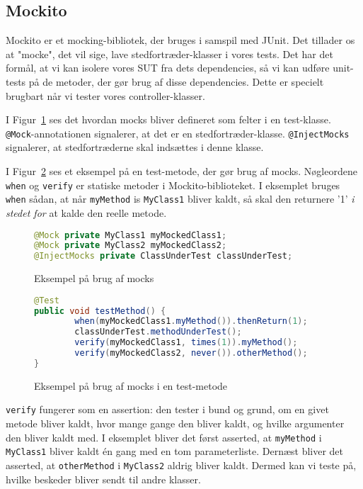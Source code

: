 \subsection{Mockito}
Mockito er et mocking-bibliotek, der bruges i samspil med JUnit. Det tillader os at "mocke", det vil sige, lave stedfortræder-klasser i vores tests. Det har det formål, at vi kan isolere vores SUT fra dets dependencies, så vi kan udføre unit-tests på de metoder, der gør brug af disse dependencies. Dette er specielt brugbart når vi tester vores controller-klasser.

I Figur~\ref{fig:MockEkempel} ses det hvordan mocks bliver defineret som felter i en test-klasse. \texttt{@Mock}-annotationen signalerer, at det er en stedfortræder-klasse. \texttt{@InjectMocks} signalerer, at stedfortræderne skal indsættes i denne klasse.

I Figur~\ref{fig:MockTestEksempel} ses et eksempel på en test-metode, der gør brug af mocks. Nøgleordene \texttt{when} og \texttt{verify} er statiske metoder i Mockito-biblioteket. I eksemplet bruges \texttt{when} sådan, at når \texttt{myMethod} is \texttt{MyClass1} bliver kaldt, så skal den returnere '1' \textit{i stedet for} at kalde den reelle metode. 

\begin{figure}
    \begin{lstlisting}[language=Java]
@Mock private MyClass1 myMockedClass1;
@Mock private MyClass2 myMockedClass2;
@InjectMocks private ClassUnderTest classUnderTest;
    \end{lstlisting}
    \caption{Eksempel på brug af mocks \label{fig:MockEkempel}}
\end{figure}

\begin{figure}
    \begin{lstlisting}[language=Java]
@Test
public void testMethod() {
        when(myMockedClass1.myMethod()).thenReturn(1);
        classUnderTest.methodUnderTest();
        verify(myMockedClass1, times(1)).myMethod();
        verify(myMockedClass2, never()).otherMethod();
}
    \end{lstlisting}
    \caption{Eksempel på brug af mocks i en test-metode\label{fig:MockTestEksempel}}
\end{figure}

\texttt{verify} fungerer som en assertion: den tester i bund og grund, om en givet metode bliver kaldt, hvor mange gange den bliver kaldt, og hvilke argumenter den bliver kaldt med. I eksemplet bliver det først asserted, at \texttt{myMethod} i \texttt{MyClass1} bliver kaldt én gang med en tom parameterliste. Dernæst bliver det asserted, at \texttt{otherMethod} i \texttt{MyClass2} aldrig bliver kaldt. Dermed kan vi teste på, hvilke beskeder bliver sendt til andre klasser.
